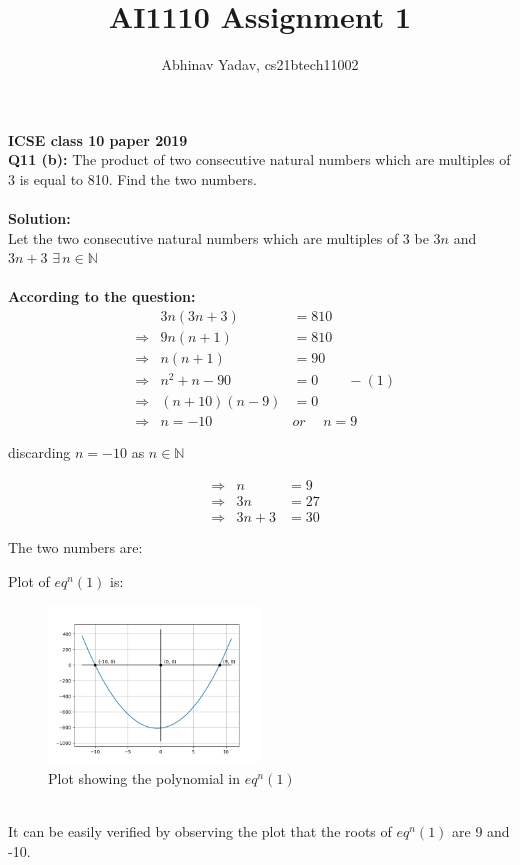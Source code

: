 \documentclass[journal, 12pt, twocolumn]{IEEEtran}
\title{AI1110 Assignment 1}
\author{Abhinav Yadav, cs21btech11002}
\begin{document}
    \maketitle

    \textbf{ICSE class 10 paper 2019}\\
    \textbf{Q11 (b):}
    The product of two consecutive natural numbers which are multiples of 3 is 
    equal to 810. Find the two numbers.\\\\
    \textbf{Solution:}\\
    Let the two consecutive natural numbers which are multiples of $3$ be $3n$ and $3n+3$
    \hspace{5pt} $\exists \hspace{2pt} n \in \mathbb{N}$\\\\
    \textbf{According to the question:}
    \begin{align*}
        &&3n(3n+3) &= 810\\
        &\Rightarrow & 9n(n+1) &= 810\\
        &\Rightarrow & n(n+1) &= 90\\
        &\Rightarrow & n^2+n-90 &= 0\hspace{25pt} -(1)\\
        &\Rightarrow & (n+10)(n-9) &= 0\\
        &\Rightarrow & n=-10 \hspace{15pt} &or \hspace{15pt} n=9
    \end{align*}
    \begin{center}
        discarding $n=-10$ as $n \in \mathbb{N}$
    \end{center}
    \begin{align*}
        &\Rightarrow & n &= 9\\
        &\Rightarrow & 3n &= 27\\
        &\Rightarrow & 3n+3 &= 30\\\\
    \end{align*}
    The two numbers are:\vspace{200pt}
    \pagebreak

    Plot of $eq^n(1)$ is:
    \begin{figure}[h]
        \centering
        \includegraphics[width=0.5\textwidth]{plot.png}
        \caption{Plot showing the polynomial in $eq^n(1)$}
    \end{figure}\\
    It can be easily verified by observing the plot that the roots of $eq^n (1)$ are 9 and -10.\\\\
\end{document}
